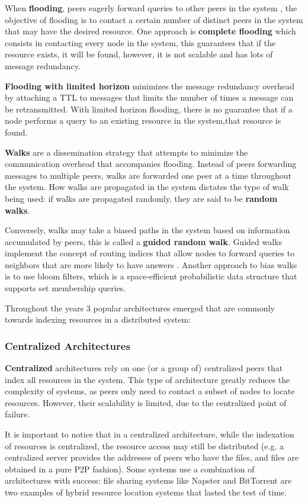 When \textbf{flooding}, peers eagerly forward queries to other peers in the system , the objective of flooding is to contact a certain number of distinct peers in the system that may have the desired resource. One approach is \textbf{complete flooding} which consists in contacting every node in the system, this guarantees that if the resource exists, it will be found, however, it is not scalable and has lots of message redundancy. 

\textbf{Flooding with limited horizon} minimizes the message redundancy overhead by attaching a TTL to messages that limits the number of times a message can be retransmitted. With limited horizon flooding, there is no guarantee that if a node performs a query to an existing resource in the system,that resource is found.

\textbf{Walks} are a dissemination strategy that attempts to minimize the communication overhead that accompanies flooding. Instead of peers forwarding messages to multiple peers, walks are forwarded one peer at a time throughout the system. How walks are propagated in the system dictates the type of walk being used: if walks are propagated randomly, they are said to be \textbf{random walks}.

Conversely, walks may take a biased paths in the system based on information accumulated by peers, this is called a \textbf{guided random walk}. Guided walks implement the concept of routing indices that allow nodes to forward queries to neighbors that are more likely to have answers \cite{1022239}. Another approach to bias walks is to use bloom filters, which is a space-efficient probabilistic data structure that supports set membership queries.

Throughout the years 3 popular architectures emerged that are commonly towards indexing resources in a distributed system:

\subsubsection{Centralized Architectures}

\textbf{Centralized} architectures rely on one (or a group of) centralized peers that index all resources in the system. This type of architecture greatly reduces the complexity of systems, as peers only need to contact a subset of nodes to locate resources. However, their scalability is limited, due to the centralized point of failure. 

It is important to notice that in a centralized architecture, while the indexation of resources is centralized, the resource access may still be distributed (e.g. a centralized server provides the addresses of peers who have the files, and files are obtained in a pure P2P fashion). Some systems use a combination of architectures with success: file sharing systems like Napster and BitTorrent \cite{cohen2003incentives} are two examples of hybrid resource location systems that lasted the test of time. 

